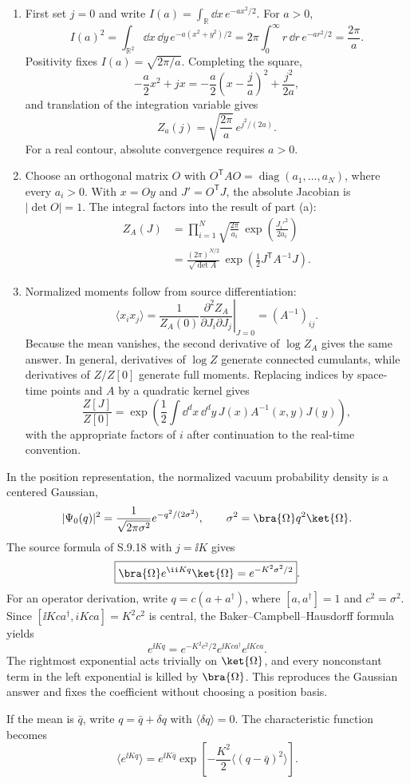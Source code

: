 \begin{enumerate}
\begin{enumerate}
\item
First set \(j=0\) and write \(I(a)=\int_{\mathbb R}\dd x\,e^{-ax^2/2}\).
For \(a>0\),
\[
 I(a)^2=\int_{\mathbb R^2}\dd x\,\dd y\,e^{-a(x^2+y^2)/2}
 =2\pi\int_0^\infty r\,\dd r\,e^{-ar^2/2}
 =\frac{2\pi}{a}.
\]
Positivity fixes \(I(a)=\sqrt{2\pi/a}\).  Completing the square,
\[
 -\frac a2x^2+jx
 =-\frac a2\left(x-\frac ja\right)^2+\frac{j^2}{2a},
\]
and translation of the integration variable gives
\[
 \boxed{Z_a(j)=\sqrt{\frac{2\pi}{a}}\,
 e^{j^2/(2a)}}.
\]
For a real contour, absolute convergence requires \(a>0\).
\item
Choose an orthogonal matrix \(O\) with
\(O^{\mathsf T}AO=\operatorname{diag}(a_1,\ldots,a_N)\), where every
\(a_i>0\).  With \(x=Oy\) and \(J'=O^{\mathsf T}J\), the absolute
Jacobian is \(|\det O|=1\).  The integral factors into the result of part
(a):
\[
\begin{aligned}
 Z_A(J)
 &=\prod_{i=1}^N
 \sqrt{\frac{2\pi}{a_i}}\,
 \exp\left(\frac{J_i'^2}{2a_i}\right)\\
 &=\boxed{\frac{(2\pi)^{N/2}}{\sqrt{\det A}}\,
 \exp\left(\frac12J^{\mathsf T}A^{-1}J\right)}.
\end{aligned}
\]
\item
Normalized moments follow from source differentiation:
\[
 \langle x_i x_j\rangle
 =\left.\frac{1}{Z_A(0)}
 \frac{\partial^2Z_A}{\partial J_i\partial J_j}\right|_{J=0}
 =(A^{-1})_{ij}.
\]
Because the mean vanishes, the second derivative of \(\log Z_A\) gives the
same answer.  In general, derivatives of \(\log Z\) generate connected
cumulants, while derivatives of \(Z/Z[0]\) generate full moments.  Replacing
indices by space-time points and \(A\) by a quadratic kernel gives
\[
 \frac{Z[J]}{Z[0]}
 =\exp\left(\frac12\int \dd^dx\,\dd^dy\,
 J(x)A^{-1}(x,y)J(y)\right),
\]
with the appropriate factors of \(i\) after continuation to the
real-time convention.
\end{enumerate}

In the position representation, the normalized vacuum probability density
is a centered Gaussian,
\[
 |\Psi_0(q)|^2=
 \frac{1}{\sqrt{2\pi\sigma^2}}
 e^{-q^2/(2\sigma^2)},
\qquad
 \sigma^2=\bra{\Omega}q^2\ket{\Omega}.
\]
The source formula of S.9.18 with \(j=\ii K\) gives
\[
 \boxed{\bra{\Omega}e^{\ii Kq}\ket{\Omega}
 =e^{-K^2\sigma^2/2}}.
\]
For an operator derivation, write
\(q=c(a+a^\dagger)\), where
\([a,a^\dagger]=1\) and \(c^2=\sigma^2\).  Since
\([\ii Kca^\dagger,iKca]=K^2c^2\) is central, the
Baker--Campbell--Hausdorff formula yields
\[
 e^{\ii Kq}
 =e^{-K^2c^2/2}e^{\ii Kca^\dagger}e^{\ii Kca}.
\]
The rightmost exponential acts trivially on \(\ket{\Omega}\), and every
nonconstant term in the left exponential is killed by
\(\bra{\Omega}\).  This reproduces the Gaussian answer and fixes the
coefficient without choosing a position basis.

If the mean is \(\bar q\), write \(q=\bar q+\delta q\) with
\(\langle\delta q\rangle=0\).  The characteristic function becomes
\[
 \boxed{\langle e^{\ii Kq}\rangle
 =e^{\ii K\bar q}
 \exp\left[-\frac{K^2}{2}
 \langle(q-\bar q)^2\rangle\right]}.
\]
\end{enumerate}
